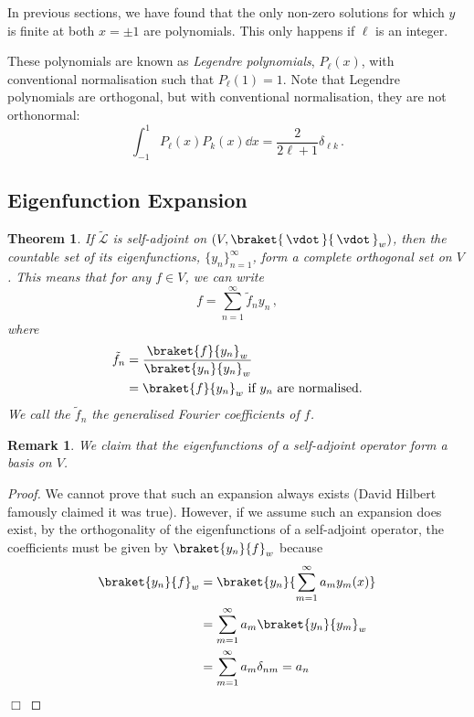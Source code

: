 \documentclass{article}
\theoremstyle{plain}\theoremheaderfont{\normalfont\itshape}\theorembodyfont{\rmfamily}\theoremseparator{.}\newtheorem*{rem}{Remark}\newtheorem*{ex}{Example}\newtheorem*{proof}{Proof}\newtheorem*{altp}{Alternative proof}
\theoremstyle{plain}\theoremheaderfont{\normalfont\bfseries}\theorembodyfont{\rmfamily}\theoremseparator{.}\newtheorem{thm}{Theorem}[section]\newtheorem{lem}[thm]{Lemma}\newtheorem{prop}[thm]{Proposition}\newtheorem*{cor}{Corollary}\newtheorem{defn}[thm]{Definition}\newtheorem{clm}[thm]{Claim}\newtheorem{clminproof}{Claim}
\theoremstyle{break}\theoremheaderfont{\normalfont\itshape}\theorembodyfont{\rmfamily}\theoremseparator{.\medskip}\newtheorem*{proofskip}{Proof}\newtheorem*{exs}{Examples}\newtheorem*{rems}{Remarks}
\theoremstyle{break}\theoremheaderfont{\normalfont\bfseries}\theorembodyfont{\rmfamily}\theoremseparator{.\medskip}\newtheorem{lemskip}[thm]{Lemma}\newtheorem{defnskip}[thm]{Definition}\newtheorem{propskip}[thm]{Proposition}\newtheorem{thmskip}[thm]{Theorem}
\numberwithin{equation}{section}
\newcommand{\qed}{\hfill\ensuremath{\Box}}
\begin{document}
	In previous sections, we have found that the only non-zero solutions for which \(y\) is finite at both \(x=\pm 1\) are polynomials. This only happens if \(\ell\) is an integer.

	These polynomials are known as \textit{Legendre polynomials}, \(P_\ell(x)\), with conventional normalisation such that \(P_\ell(1)=1\). Note that Legendre polynomials are orthogonal, but with conventional normalisation, they are not orthonormal:
	\[\int_{-1}^{1}P_\ell(x)P_k(x)\dd{x}=\frac{2}{2\ell+1}\delta_{\ell k}\,.\]

	\subsection{Eigenfunction Expansion}
	\begin{thm}
		If \(\tilde{\mathcal{L}}\) is self-adjoint on \((V,\braket{\,\vdot\,}{\,\vdot\,}_w)\), then the countable set of its eigenfunctions, \(\{y_n\}_{n=1}^{\infty}\), form a \textit{complete orthogonal set} on \(V\). This means that for any \(f\in V\), we can write
		\[f=\sum_{n=1}^{\infty}\tilde{f}_ny_n\,,\]
		where
		\begin{align*}
			\tilde{f}_n&=\frac{\braket{f}{y_n}_w}{\braket{y_n}{y_n}_w}\\
			&=\braket{f}{y_n}_w\text{ if \(y_n\) are normalised.}
		\end{align*}
		We call the \(\tilde{f}_n\) the \textit{generalised Fourier coefficients} of \(f\).
	\end{thm}
	
	\begin{rem}
		We claim that the eigenfunctions of a self-adjoint operator form a basis on \(V\).
	\end{rem}

	\begin{proof}
		We cannot prove that such an expansion always exists (David Hilbert famously claimed it was true). However, if we assume such an expansion does exist, by the orthogonality of the eigenfunctions of a self-adjoint operator, the coefficients must be given by \(\braket{y_n}{f}_w\) because
		\begin{align*}
			\braket{y_n}{f}_w&=\braket{y_n}{\sum_{m=1}^{\infty}a_m y_m(x)}\\
			&=\sum_{m=1}^{\infty} a_m\braket{y_n}{y_m}_w\\
			&=\sum_{m=1}^{\infty} a_m\delta_{nm}=a_n
		\end{align*}\qed
	\end{proof}
\end{document}
